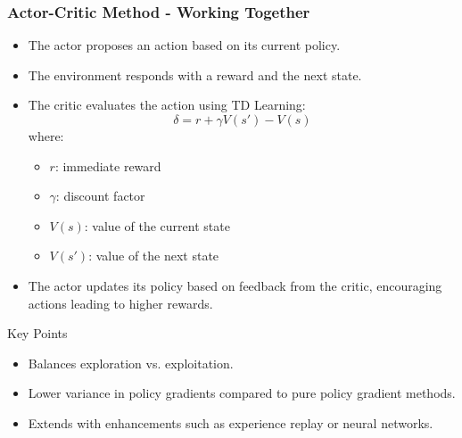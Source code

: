 \documentclass{beamer}
\begin{document}
\begin{frame}[fragile]
    \frametitle{Actor-Critic Method - Working Together}
    \begin{itemize}
        \item The actor proposes an action based on its current policy.
        \item The environment responds with a reward and the next state.
        \item The critic evaluates the action using TD Learning:
            \begin{equation}
                \delta = r + \gamma V(s') - V(s)
            \end{equation}
            where:
            \begin{itemize}
                \item \( r \): immediate reward
                \item \( \gamma \): discount factor
                \item \( V(s) \): value of the current state
                \item \( V(s') \): value of the next state
            \end{itemize}
        \item The actor updates its policy based on feedback from the critic, encouraging actions leading to higher rewards.
    \end{itemize}

    \begin{block}{Key Points}
        \begin{itemize}
            \item Balances exploration vs. exploitation.
            \item Lower variance in policy gradients compared to pure policy gradient methods.
            \item Extends with enhancements such as experience replay or neural networks.
        \end{itemize}
    \end{block}
\end{frame}
\end{document}
